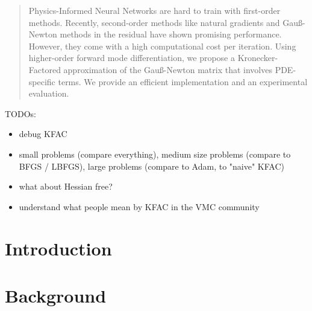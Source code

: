 \documentclass{article}
\begin{document}
\maketitle

\begin{abstract}
  Physics-Informed Neural Networks are hard to train with first-order methods. Recently, second-order methods like natural gradients and Gauß-Newton methods in the residual have shown promising performance. However, they come with a high computational cost per iteration. Using higher-order forward mode differentiation, we propose a Kronecker-Factored approximation of the Gauß-Newton matrix that involves PDE-specific terms. We provide an efficient implementation and an experimental evaluation. 
\end{abstract}

TODOs: 
\begin{itemize}
    \item debug KFAC 
    \item small problems (compare everything), medium size problems (compare to BFGS / LBFGS), large problems (compare to Adam, to "naive" KFAC) 
    \item what about Hessian free?
    \item understand what people mean by KFAC in the VMC community 
\end{itemize}

\section{Introduction}


\section{Background}



\end{document}
